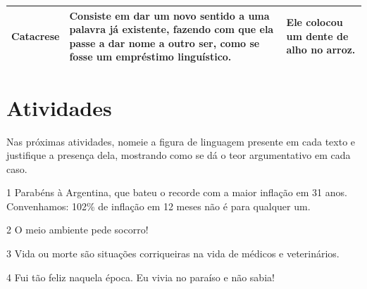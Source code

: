 \begin{longtable}[]{@{}lll@{}}
\begin{minipage}[t]{0.29\columnwidth}
Catacrese\strut
\end{minipage} & \begin{minipage}[t]{0.29\columnwidth}\raggedright
Consiste em dar um novo sentido a uma palavra já existente, fazendo com
que ela passe a dar nome a outro ser, como se fosse um empréstimo
linguístico.\strut
\end{minipage} & \begin{minipage}[t]{0.29\columnwidth}\raggedright
Ele colocou um dente de alho no arroz.\strut
\end{minipage}\tabularnewline
\bottomrule
\end{longtable}

\section{Atividades}

Nas próximas atividades, nomeie a figura de linguagem presente em cada
texto e justifique a presença dela, mostrando como se dá o teor
argumentativo em cada caso.


\num{1} Parabéns à Argentina, que bateu o recorde com a maior inflação
em 31 anos. Convenhamos: 102\% de inflação em 12 meses não é para
qualquer um.


\num{2} O meio ambiente pede socorro!


\num{3} Vida ou morte são situações corriqueiras na vida de médicos e
veterinários.


\num{4} Fui tão feliz naquela época. Eu vivia no paraíso e não sabia!


